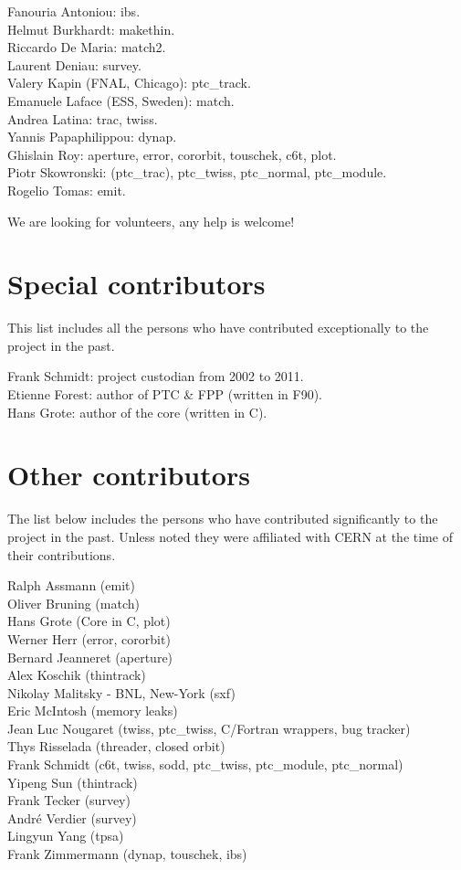 Fanouria Antoniou: ibs.\\
Helmut Burkhardt: makethin.\\
Riccardo De Maria: match2.\\
Laurent Deniau: survey.\\
Valery Kapin (FNAL, Chicago): ptc\_track.\\
Emanuele Laface (ESS, Sweden): match.\\
Andrea Latina: trac, twiss.\\
Yannis Papaphilippou: dynap.\\
Ghislain Roy: aperture, error, cororbit, touschek, c6t, plot.\\
Piotr Skowronski: (ptc\_trac), ptc\_twiss, ptc\_normal, ptc\_module.\\
Rogelio Tomas: emit.

We are looking for volunteers, any help is welcome!


\section{Special contributors}

This list includes all the persons who have contributed exceptionally to the project in the past.

Frank Schmidt: project custodian from 2002 to 2011. \\
Etienne Forest: author of PTC \& FPP (written in F90). \\
Hans Grote: author of the core (written in C).


\section{Other contributors}

The list below includes the persons who have contributed significantly
to the \madx project in the past. Unless noted they were affiliated with
CERN at the time of their contributions. 

Ralph Assmann  (emit) \\
Oliver Bruning (match) \\
Hans Grote (Core in C, plot) \\
Werner Herr (error, cororbit) \\
Bernard Jeanneret (aperture) \\
Alex Koschik (thintrack) \\
Nikolay Malitsky - BNL, New-York  (sxf) \\
Eric McIntosh (memory leaks) \\
Jean Luc Nougaret (twiss, ptc\_twiss, C/Fortran wrappers, bug tracker) \\
Thys Risselada (threader, closed orbit) \\
Frank Schmidt (c6t, twiss, sodd, ptc\_twiss, ptc\_module, ptc\_normal) \\
Yipeng Sun (thintrack) \\
Frank Tecker (survey) \\
Andr\'e Verdier (survey) \\
Lingyun Yang (tpsa) \\
Frank Zimmermann (dynap, touschek, ibs) \\

